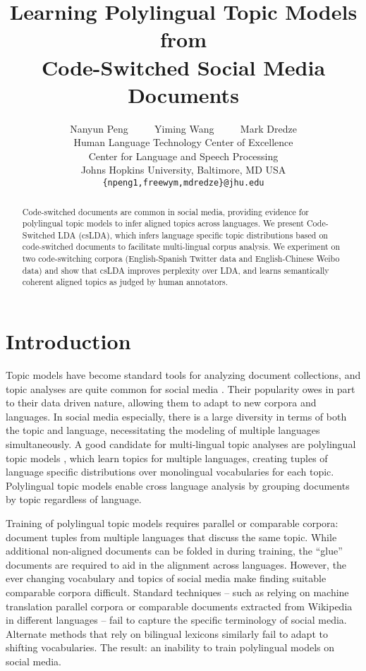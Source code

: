\documentclass[11pt]{article}
\title{Learning Polylingual Topic Models from\\ Code-Switched Social Media Documents}
\author{Nanyun Peng ~~~~ Yiming Wang ~~~~ Mark Dredze\\
        Human Language Technology Center of Excellence \\
	    Center for Language and Speech Processing\\
	    Johns Hopkins University, Baltimore, MD USA\\
	    {\tt \{npeng1,freewym,mdredze\}@jhu.edu}}
\date{}
\begin{document}
\maketitle
\begin{abstract}
Code-switched documents are common in social media, providing evidence for
polylingual topic models to infer aligned topics across languages.
We present Code-Switched LDA (csLDA), which infers language specific topic distributions
based on code-switched documents to facilitate multi-lingual corpus analysis.
We experiment on two code-switching corpora (English-Spanish Twitter data and English-Chinese Weibo data) and show that csLDA improves perplexity over LDA, and learns semantically coherent aligned topics as judged by human annotators.
\end{abstract}

\section{Introduction}
Topic models \cite{blei2003latent} have become standard tools for analyzing document collections, and 
topic analyses %
are quite common for social media \cite{paul2011you,zhao2011comparing,hong2010empirical,ramage2010characterizing,eisenstein2010latent}.
Their popularity owes in part to their data driven nature, allowing them to adapt to new
corpora and languages.
In social media especially, there is a large diversity in terms of both the topic
and language,
necessitating the modeling of multiple languages simultaneously.
A good candidate for multi-lingual topic analyses are polylingual topic models \cite{mimno2009polylingual},
which learn topics for multiple languages, creating tuples of language specific distributions over monolingual vocabularies for each topic.
Polylingual topic models enable cross language analysis by grouping documents by topic
regardless of language.

Training of polylingual topic models requires parallel or comparable corpora:
document tuples from multiple languages that discuss the same topic. While
additional non-aligned documents can be folded in during training, the ``glue'' documents
are required to aid in the alignment across languages.
However, the ever changing vocabulary and topics of social media \cite{Eisenstein:2013fk}
make finding suitable comparable corpora difficult. Standard techniques -- such
as relying on machine translation parallel corpora or comparable documents extracted
from Wikipedia in different languages -- fail to capture the specific terminology of social media.
Alternate methods that rely on bilingual
lexicons \cite{jagarlamudi2010extracting} similarly fail to adapt to shifting vocabularies. The result:
an inability to train polylingual models on social media.
\end{document}
